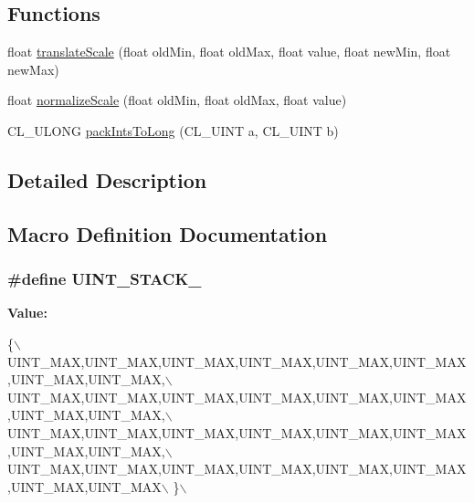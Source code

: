 \subsection*{Functions}
\begin{DoxyCompactItemize}
\item 
float \hyperlink{group__g15_gae04974b0f8235c8ae4cf9ea223633b20}{translate\+Scale} (float old\+Min, float old\+Max, float value, float new\+Min, float new\+Max)
\item 
float \hyperlink{group__g15_gad7c85e6072c894fbb48f02e82bea0fcb}{normalize\+Scale} (float old\+Min, float old\+Max, float value)
\item 
C\+L\+\_\+\+U\+L\+O\+NG \hyperlink{group__g15_ga117099011d27ac9e9de51f4b5fe8ef1f}{pack\+Ints\+To\+Long} (C\+L\+\_\+\+U\+I\+NT a, C\+L\+\_\+\+U\+I\+NT b)
\end{DoxyCompactItemize}


\subsection{Detailed Description}


\subsection{Macro Definition Documentation}
\subsubsection[{\texorpdfstring{U\+I\+N\+T\+\_\+\+S\+T\+A\+C\+K\+\_\+32}{UINT_STACK_32}}]{\setlength{\rightskip}{0pt plus 5cm}\#define U\+I\+N\+T\+\_\+\+S\+T\+A\+C\+K\+\_}\hypertarget{group__g15_gaad6b8db959682120a6bad3ef3ef6cf87}{}\label{group__g15_gaad6b8db959682120a6bad3ef3ef6cf87}
{\bfseries Value\+:}
\begin{DoxyCode}
\{\(\backslash\)
        UINT\_MAX,UINT\_MAX,UINT\_MAX,UINT\_MAX,UINT\_MAX,UINT\_MAX,UINT\_MAX,UINT\_MAX,\(\backslash\)
        UINT\_MAX,UINT\_MAX,UINT\_MAX,UINT\_MAX,UINT\_MAX,UINT\_MAX,UINT\_MAX,UINT\_MAX,\(\backslash\)
        UINT\_MAX,UINT\_MAX,UINT\_MAX,UINT\_MAX,UINT\_MAX,UINT\_MAX,UINT\_MAX,UINT\_MAX,\(\backslash\)
        UINT\_MAX,UINT\_MAX,UINT\_MAX,UINT\_MAX,UINT\_MAX,UINT\_MAX,UINT\_MAX,UINT\_MAX\(\backslash\)
    \}\(\backslash\)
\end{DoxyCode}
